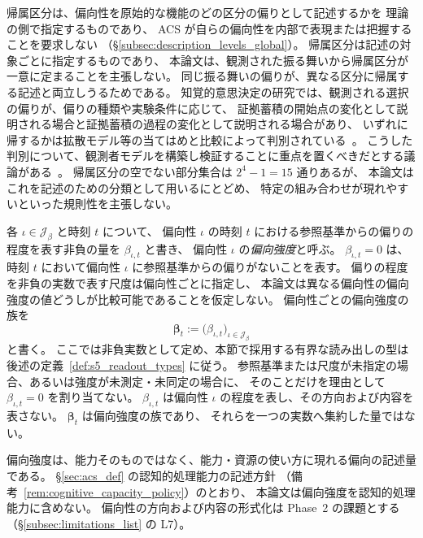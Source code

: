 \begin{remark}[帰属区分の地位]
\label{rem:bias_attribution_status}
帰属区分は、偏向性を原始的な機能のどの区分の偏りとして記述するかを
理論の側で指定するものであり、
ACS が自らの偏向性を内部で表現または把握することを要求しない
（\S\ref{subsec:description_levels_global}）。
帰属区分は記述の対象ごとに指定するものであり、
本論文は、観測された振る舞いから帰属区分が一意に定まることを主張しない。
同じ振る舞いの偏りが、異なる区分に帰属する記述と両立しうるためである。
知覚的意思決定の研究では、観測される選択の偏りが、偏りの種類や実験条件に応じて、
証拠蓄積の開始点の変化として説明される場合と証拠蓄積の過程の変化として説明される場合があり、
いずれに帰するかは拡散モデル等の当てはめと比較によって判別されている~\cite{Mulder2012,Urai2019}。
こうした判別について、観測者モデルを構築し検証することに重点を置くべきだとする議論がある~\cite{RahnevDenison2018}。
帰属区分の空でない部分集合は $2^{4}-1=15$ 通りあるが、
本論文はこれを記述のための分類として用いるにとどめ、
特定の組み合わせが現れやすいといった規則性を主張しない。
\end{remark}

\begin{definition}
\label{def:beta_accumulated}
各 $\iota\in\mathcal J_{\beta}$ と時刻 $t$ について、
偏向性 $\iota$ の時刻 $t$ における参照基準からの偏りの程度を表す非負の量を $\beta_{\iota,t}$ と書き、
偏向性 $\iota$ の\emph{偏向強度}と呼ぶ。
$\beta_{\iota,t}=0$ は、時刻 $t$ において偏向性 $\iota$ に参照基準からの偏りがないことを表す。
偏りの程度を非負の実数で表す尺度は偏向性ごとに指定し、
本論文は異なる偏向性の偏向強度の値どうしが比較可能であることを仮定しない。
偏向性ごとの偏向強度の族を
\[
  \boldsymbol{\beta}_t:=\bigl(\beta_{\iota,t}\bigr)_{\iota\in\mathcal J_{\beta}}
\]
と書く。
ここでは非負実数として定め、本節で採用する有界な読み出しの型は
後述の定義~\ref{def:s5_readout_types} に従う。
参照基準または尺度が未指定の場合、あるいは強度が未測定・未同定の場合に、
そのことだけを理由として $\beta_{\iota,t}=0$ を割り当てない。
$\beta_{\iota,t}$ は偏向性 $\iota$ の程度を表し、その方向および内容を表さない。
$\boldsymbol{\beta}_t$ は偏向強度の族であり、
それらを一つの実数へ集約した量ではない。
\end{definition}

偏向強度は、能力そのものではなく、能力・資源の使い方に現れる偏向の記述量である。
\S\ref{sec:acs_def} の認知的処理能力の記述方針
（備考~\ref{rem:cognitive_capacity_policy}）のとおり、
本論文は偏向強度を認知的処理能力に含めない。
偏向性の方向および内容の形式化は Phase~2 の課題とする（\S\ref{subsec:limitations_list} の L7）。

